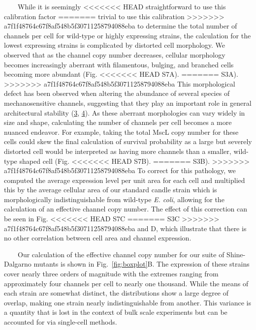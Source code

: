 ~~~~While
it is
seemingly
<<<<<<< HEAD
straightforward
to use
this
calibration
factor
=======
trivial
to use
this
calibration
>>>>>>> a7f1f48764c67f8af548b5f30711258794088eba
to
determine
the
total
number
of
channels
per
cell
for
wild-type
or
highly
expressing
strains,
the
calculation
for
the
lowest
expressing
strains
is
complicated
by
distorted
cell
morphology.
We
observed
that
as the
channel
copy
number
decreases,
cellular
morphology
becomes
increasingly
aberrant
with
filamentous,
bulging,
and
branched
cells
becoming
more
abundant
(Fig.
<<<<<<< HEAD
S7A).
=======
S3A).
>>>>>>> a7f1f48764c67f8af548b5f30711258794088eba
This
morphological
defect
has
been
observed
when
altering
the
abundance
of
several
species
of
mechanosensitive
channels,
suggesting
that
they
play
an
important
role
in
general
architectural
stability
(\protect\hyperlink{ref-bialecka-fornal2012}{3},
\protect\hyperlink{ref-bialecka-fornal2015}{4}).
As
these
aberrant
morphologies
can
vary
widely
in
size
and
shape,
calculating
the
number
of
channels
per
cell
becomes
a more
nuanced
endeavor.
For
example,
taking
the
total
MscL
copy
number
for
these
cells
could
skew
the
final
calculation
of
survival
probability
as a
large
but
severely
distorted
cell
would
be
interpreted
as
having
more
channels
than a
smaller,
wild-type
shaped
cell
(Fig.
<<<<<<< HEAD
S7B).
=======
S3B).
>>>>>>> a7f1f48764c67f8af548b5f30711258794088eba
To
correct
for
this
pathology,
we
computed
the
average
expression
level
per
unit
area
for
each
cell
and
multiplied
this
by the
average
cellular
area
of our
standard
candle
strain
which
is
morphologically
indistinguishable
from
wild-type
\emph{E.
coli},
allowing
for
the
calculation
of an
effective
channel
copy
number.
The
effect
of
this
correction
can be
seen
in
Fig.
<<<<<<< HEAD
S7C
=======
S3C
>>>>>>> a7f1f48764c67f8af548b5f30711258794088eba
and D,
which
illustrate
that
there
is no
other
correlation
between
cell
area
and
channel
expression.

~~~~Our
calculation
of the
effective
channel
copy
number
for
our
suite
of
Shine-Dalgarno
mutants
is
shown
in
Fig.~\ref{fig:boxplot}B.
The
expression
of
these
strains
cover
nearly
three
orders
of
magnitude
with
the
extremes
ranging
from
approximately
four
channels
per
cell
to
nearly
one
thousand.
While
the
means
of
each
strain
are
somewhat
distinct,
the
distributions
show a
large
degree
of
overlap,
making
one
strain
nearly
indistinguishable
from
another.
This
variance
is a
quantity
that
is
lost
in the
context
of
bulk
scale
experiments
but
can be
accounted
for
via
single-cell
methods.

